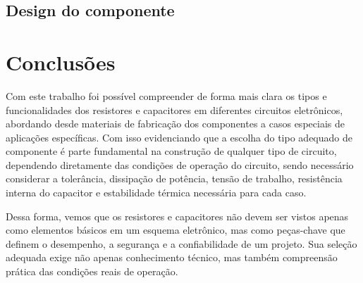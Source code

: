 \documentclass[12pt]{article}
\begin{document}
        \subsection{Design do componente}
        \subsection{}
        \subsection{}

\section{Conclusões}

    Com este trabalho foi possível compreender de forma mais clara os tipos e funcionalidades dos resistores e capacitores em diferentes circuitos eletrônicos, abordando desde materiais de fabricação dos componentes a casos especiais de aplicações específicas. Com isso evidenciando que a escolha do tipo adequado de componente é parte fundamental na construção de qualquer tipo de circuito, dependendo diretamente das condições de operação do circuito, sendo necessário considerar a tolerância, dissipação de potência, tensão de trabalho, resistência interna do capacitor e estabilidade térmica necessária para cada caso.

    Dessa forma, vemos que os resistores e capacitores não devem ser vistos apenas como elementos básicos em um esquema eletrônico, mas como peças-chave que definem o desempenho, a segurança e a confiabilidade de um projeto. Sua seleção adequada exige não apenas conhecimento técnico, mas também compreensão prática das condições reais de operação.

\newpage


\end{document}
